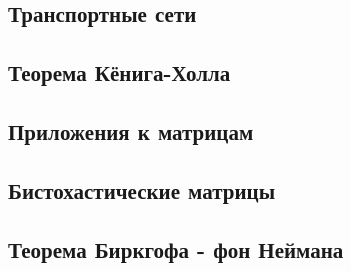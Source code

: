 \documentclass[a4paper, 12pt]{extarticle}
\begin{document}








































\subsection{Транспортные сети}
\subsection{Теорема Кёнига-Холла}
\subsection{Приложения к матрицам}
\subsection{Бистохастические матрицы}
\subsection{Теорема Биркгофа - фон Неймана}
\end{document}
